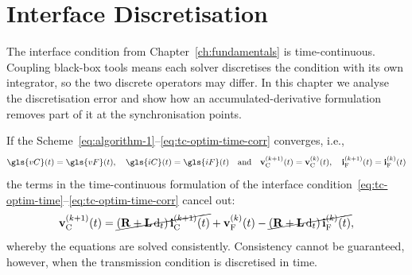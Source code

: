 
\chapter{Interface Discretisation}\label{ch:interface-discretisation}
The interface condition from Chapter~\ref{ch:fundamentals} is time-continuous. Coupling black-box tools means each solver discretises the condition with its own integrator, so the two discrete operators may differ. In this chapter we analyse the discretisation error and show how an accumulated-derivative formulation removes part of it at the synchronisation points.

If the Scheme~\eqref{eq:algorithm-1}--\eqref{eq:tc-optim-time-corr} converges, i.e., 
\begin{equation*}
    \gls{vC}(t) = \gls{vF}(t)
    , \quad
    \gls{iC}(t) = \gls{iF}(t)
    \quad \text{and} \quad
    \mathbf{v}_{\text{C}}^{(k+1)}(t) = \mathbf{v}_{\text{C}}^{(k)}(t)
    , \quad
    \mathbf{i}_{\text{F}}^{(k+1)}(t) = \mathbf{i}_{\text{F}}^{(k)}(t)
\end{equation*}
the terms in the time-continuous formulation of the interface condition~\eqref{eq:tc-optim-time}--\eqref{eq:tc-optim-time-corr} cancel out:
\begin{equation*}
    \mathbf{v}_{\text{C}}^{(k+1)}(t) = \cancel{(\mathbf{R} + \mathbf{L} \, \mathrm{d}_t)\, \mathbf{i}_{\text{C}}^{(k+1)}(t)} + \mathbf{v}_{\text{F}}^{(k)}(t) - \cancel{(\mathbf{R} + \mathbf{L} \, \mathrm{d}_t)\, \mathbf{i}_{\text{F}}^{(k)}(t)},
\end{equation*}
whereby the equations are solved consistently. Consistency cannot be guaranteed, however, when the transmission condition is discretised in time.

